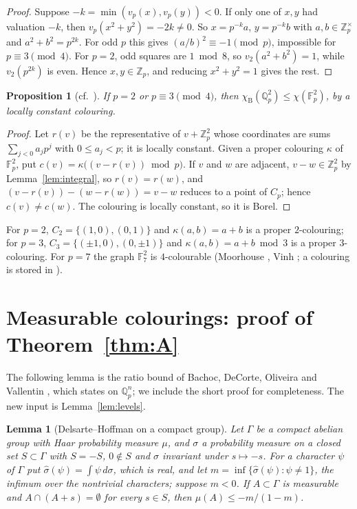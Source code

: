 \documentclass[11pt,a4paper]{amsart}
\newtheorem{proposition}[theorem]{Proposition}
\newtheorem{lemma}[theorem]{Lemma}
\theoremstyle{remark}
\newcommand{\F}{\mathbb{F}}
\newcommand{\Q}{\mathbb{Q}}
\newcommand{\Z}{\mathbb{Z}}
\newcommand{\chiB}{\chi_{\mathrm{B}}}
\begin{document}
\begin{proof}
Suppose $-k=\min(v_p(x),v_p(y))<0$. If only one of $x,y$ had valuation $-k$, then $v_p(x^2+y^2)=-2k\ne0$. So
$x=p^{-k}a$, $y=p^{-k}b$ with $a,b\in\Z_p^\times$ and $a^2+b^2=p^{2k}$. For odd $p$ this gives
$(a/b)^2\equiv-1\pmod p$, impossible for $p\equiv3\pmod4$. For $p=2$, odd squares are $1\bmod8$, so
$v_2(a^2+b^2)=1$, while $v_2(p^{2k})$ is even. Hence $x,y\in\Z_p$, and reducing $x^2+y^2=1$ gives the rest.
\end{proof}

\begin{proposition}[cf.\ {\cite[Remark~3.6]{Madore}}]\label{prop:upper}
If $p=2$ or $p\equiv3\pmod4$, then $\chiB(\Q_p^2)\le\chi(\F_p^2)$, by a locally constant colouring.
\end{proposition}

\begin{proof}
Let $r(v)$ be the representative of $v+\Z_p^2$ whose coordinates are sums $\sum_{j<0}a_jp^j$ with
$0\le a_j<p$; it is locally constant. Given a proper colouring $\kappa$ of $\F_p^2$, put
$c(v)=\kappa\bigl((v-r(v))\bmod p\bigr)$. If $v$ and $w$ are adjacent, $v-w\in\Z_p^2$ by
Lemma~\ref{lem:integral}, so $r(v)=r(w)$, and $(v-r(v))-(w-r(w))=v-w$ reduces to a point of $C_p$; hence
$c(v)\ne c(w)$. The colouring is locally constant, so it is Borel.
\end{proof}

For $p=2$, $C_2=\{(1,0),(0,1)\}$ and $\kappa(a,b)=a+b$ is a proper $2$-colouring; for $p=3$,
$C_3=\{(\pm1,0),(0,\pm1)\}$ and $\kappa(a,b)=a+b\bmod3$ is a proper $3$-colouring. For $p=7$ the graph
$\F_7^2$ is $4$-colourable (Moorhouse \cite{Moorhouse}, Vinh \cite{Vinh}; a colouring is stored in \cite{Repo}).

\section{Measurable colourings: proof of \texorpdfstring{Theorem~\ref{thm:A}}{Theorem 1}}

The following lemma is the ratio bound of Bachoc, DeCorte, Oliveira and Vallentin \cite{BDOV}, which
\cite[Theorem~2.5]{BMK} states on $\Q_p^n$; we include the short proof for completeness. The new input is
Lemma~\ref{lem:levels}.

\begin{lemma}[Delsarte--Hoffman on a compact group]\label{lem:DH}
Let $\Gamma$ be a compact abelian group with Haar probability measure $\mu$, and $\sigma$ a probability measure
on a closed set $S\subset\Gamma$ with $S=-S$, $0\notin S$ and $\sigma$ invariant under $s\mapsto-s$. For a
character $\psi$ of $\Gamma$ put $\hat\sigma(\psi)=\int\psi\,d\sigma$, which is real, and let
$m=\inf\{\hat\sigma(\psi):\psi\ne1\}$, the infimum over the nontrivial characters; suppose $m<0$. If
$A\subset\Gamma$ is measurable and $A\cap(A+s)=\emptyset$ for every $s\in S$, then $\mu(A)\le -m/(1-m)$.
\end{lemma}
\end{document}
